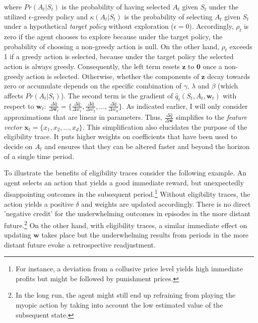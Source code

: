 where $Pr(A_t|S_t)$ is the probability of having selected $A_t$ given $S_t$ under the utilized $\epsilon$-greedy policy and $\kappa(A_t|S_t)$ is the probability of selecting $A_t$ given $S_t$ under a hypothetical \emph{target policy} without exploration ($\epsilon = 0$). Accordingly, $\rho_t$ is zero if the agent chooses to explore because under the target policy, the probability of choosing a non-greedy action is null. On the other hand, $\rho_t$ exceeds 1 if a greedy action is selected, because under the target policy the selected action is always greedy. Consequently, the left term resets $\boldsymbol{z}$ to $\boldsymbol{0}$ once a non-greedy action is selected. Otherwise, whether the components of $\boldsymbol{z}$ decay towards zero or accumulate depends on the specific combination of $\gamma$, $\lambda$ and $\beta$ (which affects $Pr(A_t|S_t)$). The second term is the gradient of $\hat{q}_t(S_t, A_t, \boldsymbol{w}_t)$ with respect to $\boldsymbol{w}_t$:
$\frac{\Delta \hat{q}}{\Delta \boldsymbol{w}_t} =
\{ \frac{\Delta \hat{q}}{\Delta w_1},
\frac{\Delta \hat{q}}{\Delta w_2},
...,
\frac{\Delta \hat{q}}{\Delta w_d}  \}$. As indicated earlier, I will only consider approximations that are linear in parameters. Thus, $\frac{\Delta \hat{q}}{\Delta \boldsymbol{w}}$ simplifies to the \emph{feature vector} $\boldsymbol{x}_t = \{x_1, x_2, ..., x_d\}$. This simplification also elucidates the purpose of the eligibility trace. It puts higher weights on coefficients that have been used to decide on $A_t$ and ensures that they can be altered faster and beyond the horizon of a single time period.

To illustrate the benefits of eligibility traces consider the following example. An agent selects an action that yields a good immediate reward, but unexpectedly disappointing outcomes in the subsequent period.\footnote{For instance, a deviation from a collusive price level yields high immediate profits but might be followed by punishment prices.} Without eligibility traces, the action yields a positive $\delta$ and weights are updated accordingly. There is no direct 'negative credit' for the underwhelming outcomes in episodes in the more distant future.\footnote{In the long run, the agent might still end up refraining from playing the myopic action by taking into account the low estimated value of the subsequent state.} On the other hand, with eligibility traces, a similar immediate effect on updating $\boldsymbol{w}$ takes place but the underwhelming results from periods in the more distant future evoke a retrospective readjustment.

